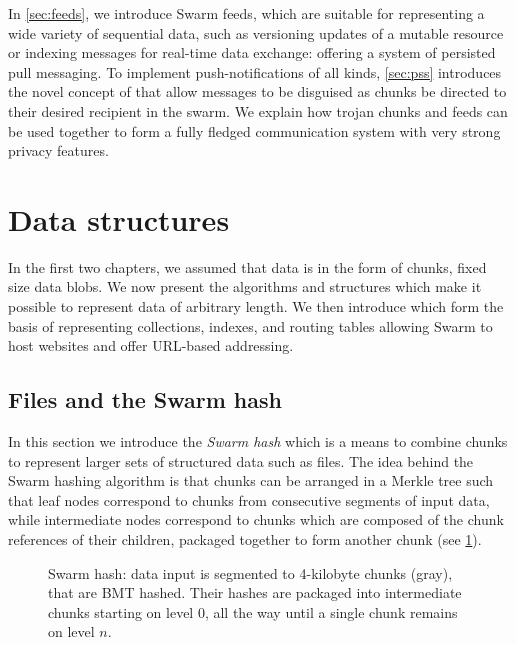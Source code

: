 In \ref{sec:feeds}, we introduce Swarm feeds, which are suitable for representing a wide variety of sequential data, such as versioning updates of a mutable resource or indexing messages for real-time data exchange: offering a system of persisted pull messaging. To implement push-notifications of all kinds, \ref{sec:pss} introduces the novel concept of  that allow messages to be disguised as chunks be directed to their desired recipient in the swarm. We explain how trojan chunks and feeds can be used together to form a fully fledged communication system with very strong privacy features.                                                       

\section{Data structures\statusgreen}\label{sec:datastructures}

\green{}

In the first two chapters, we assumed that data is in the form of chunks, fixed size data blobs. We now present the algorithms and structures which make it possible to represent data of arbitrary length. We then introduce  which form the basis of representing collections, indexes, and routing tables allowing Swarm to host websites and offer URL-based addressing.

\subsection{Files and the Swarm hash\statusgreen}\label{sec:files}

In this section we introduce the \emph{Swarm hash} which is a means to combine chunks to represent larger sets of structured data such as files. The idea behind the Swarm hashing algorithm is that chunks can be arranged in a Merkle tree such that leaf nodes correspond to chunks from consecutive segments of input data, while intermediate nodes correspond to chunks which are composed of the chunk references of their children,  packaged together to form another chunk (see \ref{fig:Swarm-hash}). 



\begin{figure}[htbp]
\centering
\resizebox{1\textwidth}{!}{
    
}
\caption[Swarm hash \statusgreen]{Swarm hash: data input is segmented to 4-kilobyte chunks (gray), that are BMT hashed. Their hashes are packaged into intermediate chunks starting on level $0$, all the way until a single chunk remains on level $n$. }
\label{fig:Swarm-hash}
\end{figure}

